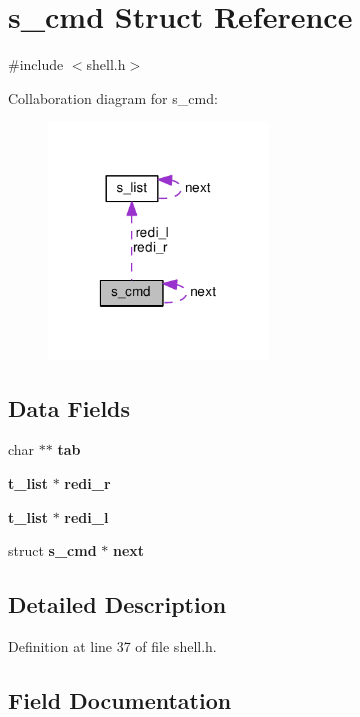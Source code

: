 \section{s\-\_\-cmd Struct Reference}
\label{structs__cmd}


{\ttfamily \#include $<$shell.\-h$>$}



Collaboration diagram for s\-\_\-cmd\-:\nopagebreak
\begin{figure}[H]
\begin{center}
\leavevmode
\includegraphics[width=166pt]{structs__cmd__coll__graph}
\end{center}
\end{figure}
\subsection*{Data Fields}
\begin{DoxyCompactItemize}
\item 
char $\ast$$\ast$ {\bf tab}
\item 
{\bf t\-\_\-list} $\ast$ {\bf redi\-\_\-r}
\item 
{\bf t\-\_\-list} $\ast$ {\bf redi\-\_\-l}
\item 
struct {\bf s\-\_\-cmd} $\ast$ {\bf next}
\end{DoxyCompactItemize}


\subsection{Detailed Description}


Definition at line 37 of file shell.\-h.



\subsection{Field Documentation}
